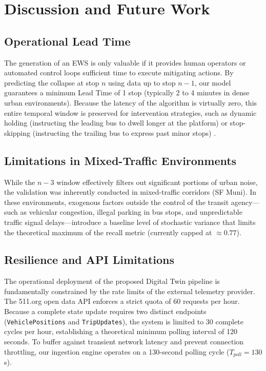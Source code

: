 \documentclass[journal,twocolumn]{IEEEtran}
\begin{document}
\section{Discussion and Future Work}

\subsection{Operational Lead Time}
The generation of an EWS is only valuable if it provides human operators or automated control loops sufficient time to execute mitigating actions. By predicting the collapse at stop $n$ using data up to stop $n-1$, our model guarantees a minimum Lead Time of 1 stop (typically 2 to 4 minutes in dense urban environments). Because the latency of the algorithm is virtually zero, this entire temporal window is preserved for intervention strategies, such as dynamic holding (instructing the leading bus to dwell longer at the platform) or stop-skipping (instructing the trailing bus to express past minor stops) \cite{10}.

\subsection{Limitations in Mixed-Traffic Environments}
While the $n-3$ window effectively filters out significant portions of urban noise, the validation was inherently conducted in mixed-traffic corridors (SF Muni). In these environments, exogenous factors outside the control of the transit agency---such as vehicular congestion, illegal parking in bus stops, and unpredictable traffic signal delays---introduce a baseline level of stochastic variance that limits the theoretical maximum of the recall metric (currently capped at $\approx 0.77$).

\subsection{Resilience and API Limitations}
The operational deployment of the proposed Digital Twin pipeline is fundamentally constrained by the rate limits of the external telemetry provider. The 511.org open data API enforces a strict quota of 60 requests per hour. Because a complete state update requires two distinct endpoints (\texttt{VehiclePositions} and \texttt{TripUpdates}), the system is limited to 30 complete cycles per hour, establishing a theoretical minimum polling interval of 120 seconds. To buffer against transient network latency and prevent connection throttling, our ingestion engine operates on a 130-second polling cycle ($T_{poll} = 130$ s).
\end{document}
